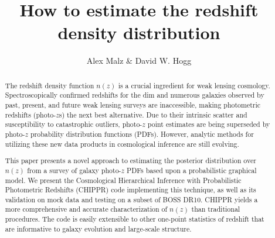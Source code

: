 \documentclass[preprint]{aastex}
\begin{document}
\title{How to estimate the redshift density distribution}

\author{Alex Malz \& David W. Hogg}


\begin{abstract}
The redshift density function $n(z)$ is a crucial ingredient for weak lensing cosmology.  Spectroscopically confirmed redshifts for the dim and numerous galaxies observed by past, present, and future weak lensing surveys are inaccessible, making photometric redshifts (photo-$z$s) the next best alternative.  Due to their intrinsic scatter and susceptibility to catastrophic outliers, photo-$z$ point estimates are being superseded by photo-$z$ probability distribution functions (PDFs).  However, analytic methods for utilizing these new data products in cosmological inference are still evolving.

This paper presents a novel approach to estimating the posterior distribution over $n(z)$ from a survey of galaxy photo-$z$ PDFs based upon a probabilistic graphical model.  We present the Cosmological Hierarchical Inference with Probabilistic Photometric Redshifts (CHIPPR) code implementing this technique, as well as its validation on mock data and testing on a subset of BOSS DR10.  CHIPPR yields a more comprehensive and accurate characterization of $n(z)$ than traditional procedures.  The code is easily extensible to other one-point statistics of redshift that are informative to galaxy evolution and large-scale structure.


\end{abstract}
\end{document}
